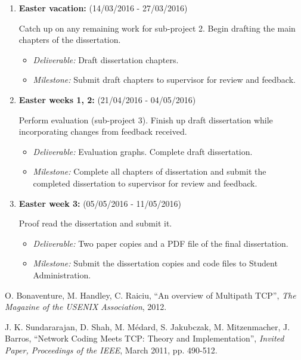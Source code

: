 \documentclass[12pt,a4paper,twoside]{article}
\begin{document}
\begin{enumerate}
\item {\bf Easter vacation:} (14/03/2016 - 27/03/2016)

Catch up on any remaining work for sub-project 2.
Begin drafting the main chapters of the dissertation.
\begin{itemize}
  \item {\em Deliverable:} Draft dissertation chapters.
  \item {\em Milestone:} Submit draft chapters to supervisor for review and feedback.
\end{itemize}

\item {\bf Easter weeks 1, 2:} (21/04/2016 - 04/05/2016)

Perform evaluation (sub-project 3). Finish up draft dissertation while incorporating changes from feedback received.
\begin{itemize}
  \item {\em Deliverable:} Evaluation graphs. Complete draft dissertation.
  \item {\em Milestone:} Complete all chapters of dissertation and submit the completed dissertation to supervisor for review and feedback.
\end{itemize}

\item {\bf Easter week 3:} (05/05/2016 - 11/05/2016)

Proof read the dissertation and submit it. 
\begin{itemize}
  \item {\em Deliverable:} Two paper copies and a PDF file of the final dissertation.
  \item {\em Milestone:} Submit the dissertation copies and code files to Student Administration.
\end{itemize}

\end{enumerate}


\begin{thebibliography}{9}

  O. Bonaventure, M. Handley, C. Raiciu,
  ``An overview of Multipath TCP'',
  \emph{The Magazine of the USENIX Association},
  2012.

  J. K. Sundararajan, D. Shah, M. Médard, S. Jakubczak, M. Mitzenmacher, J. Barros,
  ``Network Coding Meets TCP: Theory and Implementation'',
  \emph{Invited Paper, Proceedings of the IEEE},
  March 2011,
  pp. 490-512.

\end{thebibliography}
\end{document}
